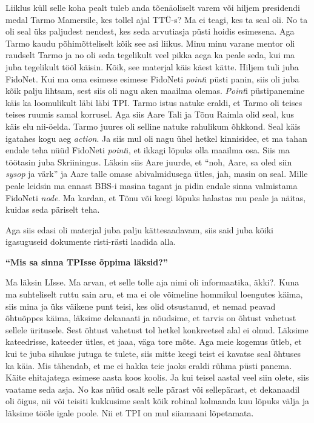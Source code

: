 Liiklus küll selle koha pealt tuleb anda tõenäoliselt varem või hiljem presidendi medal Tarmo Mamersile, kes tollel ajal TTÜ-s? Ma ei teagi, kes ta seal oli. No ta oli seal üks paljudest nendest, kes seda arvutiasja püsti hoidis esimesena. Aga Tarmo kaudu põhimõtteliselt kõik see asi liikus. Minu minu varane mentor oli raudselt Tarmo ja no oli seda tegelikult veel pikka aega ka peale seda, kui ma juba tegelikult tööl käisin. Kõik, see materjal käis käest kätte. Hiljem tuli juba FidoNet. Kui ma oma esimese esimese FidoNeti \emph{point}i püsti panin, siis oli juba kõik palju lihtsam, sest siis oli nagu aken maailma olemas. \emph{Point}i püstipanemine käis ka loomulikult läbi läbi TPI. Tarmo istus natuke eraldi, et Tarmo oli teises teises ruumis samal korrusel. Aga siis Aare Tali ja Tõnu Raimla olid seal, kus käis elu nii-öelda.  Tarmo juures oli selline natuke rahulikum õhkkond. Seal käis igatahes kogu aeg \emph{action}. Ja siis mul oli nagu ühel hetkel kinnisidee, et ma tahan endale teha nüüd FidoNeti \emph{point}i, et ikkagi lõpuks olla maailma osa. Siis ma töötasin juba Skriiningus. Läksin siis Aare juurde, et \enquote{noh, Aare, sa oled siin \emph{sysop} ja värk} ja Aare talle omase abivalmidusega ütles, jah, masin on seal. Mille peale leidsin ma ennast BBS-i masina tagant ja pidin endale sinna valmistama FidoNeti \emph{node}. Ma kardan, et Tõnu või keegi lõpuks halastas mu peale ja näitas, kuidas seda päriselt teha. 

Aga siis edasi oli materjal juba palju kättesaadavam, siis said juba kõiki igasuguseid dokumente risti-rästi laadida alla. 

\textbf{\enquote{Mis sa sinna TPIsse õppima läksid?}}

Ma läksin LIsse. Ma arvan, et selle tolle aja nimi oli informaatika, äkki?. Kuna ma suhteliselt ruttu sain aru, et ma ei ole võimeline hommikul loengutes käima, siis mina ja üks väikene punt teisi, kes olid otsustanud, et nemad peavad õhtuõppes käima, läksime dekanaati ja nõudsime, et tarvis on õhtust vahetust sellele üritusele. Sest  õhtust vahetust tol hetkel konkreetsel alal ei olnud. Läksime kateedrisse, kateeder ütles, et jaaa, väga tore mõte. Aga meie kogemus ütleb, et kui te juba sihukse jutuga te tulete, siis mitte keegi teist ei kavatse seal õhtuses ka käia. Mis tähendab, et me ei hakka teie jaoks  eraldi rühma püsti panema. Käite ehitajatega esimese aasta koos koolis. Ja kui teisel aastal veel siin olete, siis vaatame seda asja. No kas nüüd osalt selle pärast või sellepärast, et dekanaadil oli õigus, nii või teisiti kukkusime sealt kõik robinal kolmanda kuu lõpuks välja ja läksime tööle igale poole. Nii et TPI on mul siiamaani lõpetamata. 


